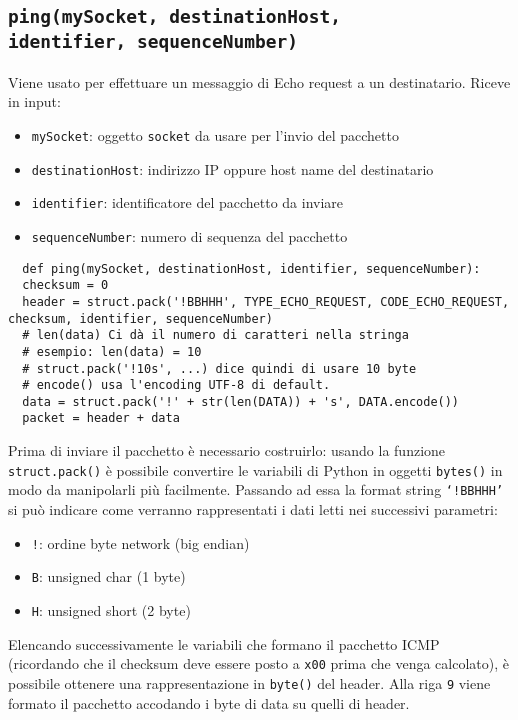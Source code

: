 \documentclass[a4paper,12pt]{report}
\begin{document}
\subsection*{\texttt{ping(mySocket, destinationHost,\\ identifier, sequenceNumber)}}
Viene usato per effettuare un messaggio di Echo request a un destinatario.
Riceve in input:
\begin{itemize} 
  \item \texttt{mySocket}: oggetto \texttt{socket} da usare per l'invio del pacchetto
  \item \texttt{destinationHost}: indirizzo IP oppure host name del destinatario
  \item \texttt{identifier}: identificatore del pacchetto da inviare
  \item \texttt{sequenceNumber}: numero di sequenza del pacchetto
\end{itemize}
\begin{verbatim}
  def ping(mySocket, destinationHost, identifier, sequenceNumber):
  checksum = 0
  header = struct.pack('!BBHHH', TYPE_ECHO_REQUEST, CODE_ECHO_REQUEST, checksum, identifier, sequenceNumber)
  # len(data) Ci dà il numero di caratteri nella stringa
  # esempio: len(data) = 10
  # struct.pack('!10s', ...) dice quindi di usare 10 byte
  # encode() usa l'encoding UTF-8 di default. 
  data = struct.pack('!' + str(len(DATA)) + 's', DATA.encode())
  packet = header + data
\end{verbatim}
Prima di inviare il pacchetto è necessario costruirlo: usando la funzione \texttt{struct.pack()} è possibile convertire le variabili di Python in oggetti \texttt{bytes()} in modo da manipolarli più facilmente.
%
Passando ad essa la format string \texttt{`!BBHHH'} si può indicare come verranno rappresentati i dati letti nei successivi parametri:
\begin{itemize}
  \item \texttt{!}: ordine byte network (big endian)
  \item \texttt{B}: unsigned char (1 byte)
  \item \texttt{H}: unsigned short (2 byte)
\end{itemize}
Elencando successivamente le variabili che formano il pacchetto ICMP (ricordando che il checksum deve essere posto a \texttt{x00} prima che venga calcolato), è possibile ottenere una rappresentazione in \texttt{byte()} del header.
%
Alla riga \texttt{9} viene formato il pacchetto accodando i byte di data su quelli di header.
\end{document}
